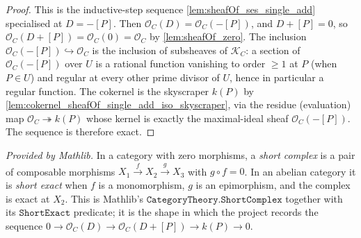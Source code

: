 \begin{proof}
  This is the inductive-step sequence \cref{lem:sheafOf_ses_single_add}
  specialised at \(D = -[P]\). Then \(\mathcal O_C(D) = \mathcal O_C(-[P])\),
  and \(D + [P] = 0\), so \(\mathcal O_C(D+[P]) = \mathcal O_C(0) =
  \mathcal O_C\) by \cref{lem:sheafOf_zero}. The inclusion
  \(\mathcal O_C(-[P]) \hookrightarrow \mathcal O_C\) is the inclusion of
  subsheaves of \(\mathcal K_C\): a section of \(\mathcal O_C(-[P])\) over
  \(U\) is a rational function vanishing to order \(\geq 1\) at \(P\) (when
  \(P \in U\)) and regular at every other prime divisor of \(U\), hence in
  particular a regular function. The cokernel is the skyscraper \(k(P)\) by
  \cref{lem:cokernel_sheafOf_single_add_iso_skyscraper}, via the residue
  (evaluation) map \(\mathcal O_C \twoheadrightarrow k(P)\) whose kernel is
  exactly the maximal-ideal sheaf \(\mathcal O_C(-[P])\). The sequence is
  therefore exact.
\end{proof}


\begin{definition}
  \label{def:shortComplex_mathlib}
  \mathlibok
  \textit{Provided by Mathlib.}
  In a category with zero morphisms, a \emph{short complex} is a pair of
  composable morphisms \(X_1 \xrightarrow{f} X_2 \xrightarrow{g} X_3\) with
  \(g \circ f = 0\). In an abelian category it is \emph{short exact} when
  \(f\) is a monomorphism, \(g\) is an epimorphism, and the complex is exact
  at \(X_2\). This is Mathlib's \(\texttt{CategoryTheory.ShortComplex}\)
  together with its \(\texttt{ShortExact}\) predicate; it is the shape in
  which the project records the sequence
  \(0 \to \mathcal O_C(D) \to \mathcal O_C(D+[P]) \to k(P) \to 0\).
\end{definition}

